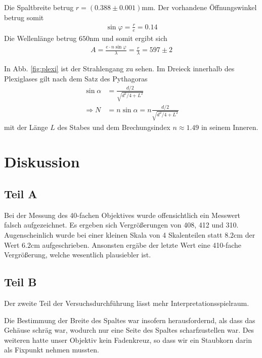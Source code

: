 \documentclass[12pt,a4paper,titlepage,headinclude,bibtotoc]{scrartcl}
\begin{document}
Die Spaltbreite betrug $r=(0.388\pm0.001)\si{\milli\metre}$.
Der vorhandene Öffnungswinkel betrug somit
\begin{align*}
\sin\varphi=\frac{r}{e}=0.14
\end{align*}
Die Wellenlänge betrug $650\si{\nano\metre}$ und somit ergibt sich
\begin{align*}
A=\frac{e\cdot n\sin\varphi}{\lambda}=\frac{r}{\lambda}=597 \pm 2
\end{align*}

In Abb. \ref{fig:plexi} ist der Strahlengang zu sehen.
Im Dreieck innerhalb des Plexiglases gilt nach dem Satz des Pythagoras
\begin{align}
\sin\alpha&=\frac{d/2}{\sqrt{d^2/4+L^2}}\\
\Rightarrow N&=n\sin\alpha=n\frac{d/2}{\sqrt{d^2/4+L^2}}
\end{align}
mit der Länge $L$ des Stabes und dem Brechungsindex $n\approx1.49$ in seinem Inneren.

\section{Diskussion}
\label{sec:diskussion}
\subsection{Teil A}
Bei der Messung des 40-fachen Objektives wurde offensichtlich ein Messwert falsch aufgezeichnet.
Es ergeben sich Vergrößerungen von 408, 412 und 310.
Augenscheinlich wurde bei einer kleinen Skala von 4 Skalenteilen statt $8.2\si{\centi\metre}$ der Wert $6.2\si{\centi\metre}$ aufgeschrieben.
Ansonsten ergäbe der letzte Wert eine 410-fache Vergrößerung, welche wesentlich plausiebler ist.

\subsection{Teil B}
Der zweite Teil der Versuchsdurchführung lässt mehr Interpretationsspielraum.

Die Bestimmung der Breite des Spaltes war insofern herausfordernd, als dass das Gehäuse schräg war, wodurch nur eine Seite des Spaltes scharfzustellen war.
Des weiteren hatte unser Objektiv kein Fadenkreuz, so dass wir ein Staubkorn darin als Fixpunkt nehmen mussten.




\end{document}
